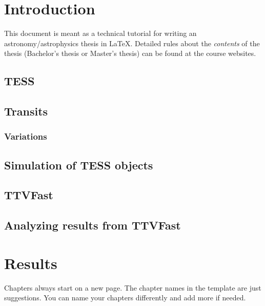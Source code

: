 \documentclass[12pt]{report}
\begin{document}
\thispagestyle{empty}
\mbox{} %

\newpage

\setcounter{page}{1} %

\tableofcontents

\newpage

\listoffigures 
\listoftables

\newpage

\chapter{Introduction}

This document is meant as a technical tutorial for writing an
astronomy/astrophysics thesis in LaTeX. Detailed rules about the {\it contents}
of the thesis (Bachelor's thesis or Master's thesis) can be found at the course
websites.

\section{TESS}


\section{Transits}

\subsection{Variations}

\section{Simulation of TESS objects}

\section{TTVFast}

\section{Analyzing results from TTVFast}



\chapter{Results}

Chapters always start on a new page. The chapter names in the template are just
suggestions. You can name your chapters differently and add more if needed.
\end{document}
